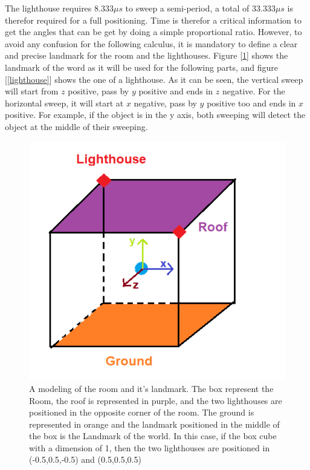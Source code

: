 \documentclass{vldb}
\begin{document}
The lighthouse requires $8.333 \mu s$ to sweep a semi-period, a total of $33.333 \mu s$ is therefor required for a full positioning.
Time is therefor a critical information to get the angles that can be get by doing a simple proportional ratio. However, to avoid any confusion for the following calculus, it is mandatory to define a clear and precise landmark for the room and the lighthouses.
\bigbreak
Figure [\ref{box}] shows the landmark of the word as it will be used for the following parts, and figure [\ref{lighthouse}] shows the one of a lighthouse. As it can be seen, the vertical sweep will start from $z$ positive, pass by $y$ positive and ends in $z$ negative. For the horizontal sweep, it will start at $x$ negative, pass by $y$ positive too and ends in $x$ positive. For example, if the object is in the y axis, both sweeping will detect the object at the middle of their sweeping. \newline
\begin{figure}
\centering
\includegraphics[width=1.0\columnwidth]{Image/box.png}
\caption{A modeling of the room and it's landmark. The box represent the Room, the roof is represented in purple, and the two lighthouses are positioned in the opposite corner of the room. The ground is represented in orange and the landmark positioned in the middle of the box is the Landmark of the world. In this case, if the box cube with a dimension of 1, then the two lighthouses are positioned in (-0.5,0.5,-0.5) and (0.5,0.5,0.5)}
\label{box}
\end{figure}
\end{document}
